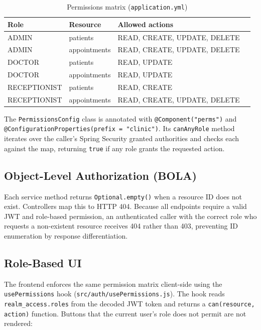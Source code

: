 \documentclass[12pt,a4paper]{report}
\begin{document}
\begin{table}[H]
\centering\small
\caption{Permissions matrix (\texttt{application.yml})}
\begin{tabular}{llll}
\toprule
\textbf{Role}  & \textbf{Resource}    & \textbf{Allowed actions} \\
\midrule
ADMIN          & patients             & READ, CREATE, UPDATE, DELETE \\
ADMIN          & appointments         & READ, CREATE, UPDATE, DELETE \\
DOCTOR         & patients             & READ, UPDATE \\
DOCTOR         & appointments         & READ, UPDATE \\
RECEPTIONIST   & patients             & READ, CREATE \\
RECEPTIONIST   & appointments         & READ, CREATE, UPDATE, DELETE \\
\bottomrule
\end{tabular}
\end{table}

The \texttt{PermissionsConfig} class is annotated with \texttt{@Component("perms")} and
\texttt{@ConfigurationProperties(prefix = "clinic")}. Its \texttt{canAnyRole} method
iterates over the caller's Spring Security granted authorities and checks each against
the map, returning \texttt{true} if any role grants the requested action.

\subsection{Object-Level Authorization (BOLA)}

Each service method returns \texttt{Optional.empty()} when a resource ID does not exist.
Controllers map this to HTTP 404. Because all endpoints require a valid JWT and
role-based permission, an authenticated caller with the correct role who requests a
non-existent resource receives 404 rather than 403, preventing ID enumeration by
response differentiation.

\subsection{Role-Based UI}

The frontend enforces the same permission matrix client-side using the \texttt{usePermissions}
hook (\texttt{src/auth/usePermissions.js}). The hook reads \texttt{realm\_access.roles} from
the decoded JWT token and returns a \texttt{can(resource, action)} function. Buttons that
the current user's role does not permit are not rendered:
\end{document}
